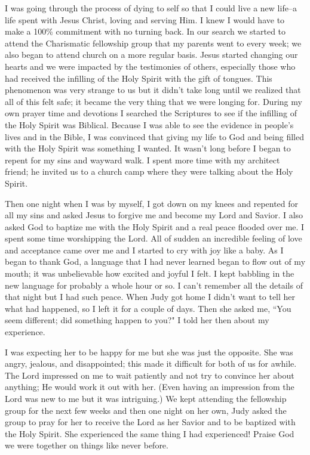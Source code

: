 \documentclass[oneside,12pt]{book}
\begin{document}
I was going through the process of dying to self so that I could live a new life--a life spent with Jesus Christ, loving and serving Him. I knew I would have to make a 100\% commitment with no turning back. In our search we started to attend the Charismatic fellowship group that my parents went to every week; we also began to attend church on a more regular basis. Jesus started changing our hearts and we were impacted by the testimonies of others, especially those who had received the infilling of the Holy Spirit with the gift of tongues. This phenomenon was very strange to us but it didn't take long until we realized that all of this felt safe; it became the very thing that we were longing for. During my own prayer time and devotions I searched the Scriptures to see if the infilling of the Holy Spirit was Biblical. Because I was able to see the evidence in people's lives and in the Bible, I was convinced that giving my life to God and being filled with the Holy Spirit was something I wanted. It wasn't long before I began to repent for my sins and wayward walk. I spent more time with my architect friend; he invited us to a church camp where they were talking about the Holy Spirit. 

Then one night when I was by myself, I got down on my knees and repented for all my sins and asked Jesus to forgive me and become my Lord and Savior. I also asked God to baptize me with the Holy Spirit and a real peace flooded over me. I spent some time worshipping the Lord. All of sudden an incredible feeling of love and acceptance came over me and I started to cry with joy like a baby. As I began to thank God, a language that I had never learned began to flow out of my mouth; it was unbelievable how excited and joyful I felt. I kept babbling in the new language for probably a whole hour or so. I can't remember all the details of that night but I had such peace. When Judy got home I didn't want to tell her what had happened, so I left it for a couple of days. Then she asked me, ``You seem different; did something happen to you?" I told her then about my experience. 

I was expecting her to be happy for me but she was just the opposite. She was angry, jealous, and disappointed; this made it difficult for both of us for awhile. The Lord impressed on me to wait patiently and not try to convince her about anything; He would work it out with her. (Even having an impression from the Lord was new to me but it was intriguing.) We kept attending the fellowship group for the next few weeks and then one night on her own, Judy asked the group to pray for her to receive the Lord as her Savior and to be baptized with the Holy Spirit. She experienced the same thing I had experienced! Praise God we were together on things like never before. 
\end{document}

